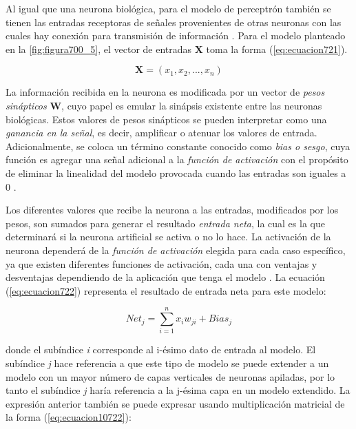 {Al igual que una neurona biológica, para el modelo de perceptrón también se tienen las entradas receptoras de señales provenientes de otras neuronas con las cuales hay conexión para transmisión de información \cite{caicedoANN}. 
Para el modelo planteado en la \autoref{fig:figura700_5}, el vector de entradas \textbf{X} toma la forma (\ref{eq:ecuacion721}).

\begin{equation}
	\textbf{X}= (x_1, x_2, ... , x_n)
	\label{eq:ecuacion721}
\end{equation}

La información recibida en la neurona es modificada por un vector de \textit{pesos sinápticos} \textbf{W}, cuyo papel es emular la sinápsis existente entre las neuronas biológicas. Estos valores de pesos sinápticos se pueden 
interpretar como una \textit{ganancia en la señal}, es decir, amplificar o atenuar los valores de entrada. Adicionalmente, se coloca un término constante conocido como \textit{bias o sesgo}, cuya función es agregar una señal 
adicional a la \textit{función de activación} con el propósito de eliminar la linealidad del modelo provocada cuando las entradas son iguales a 0 \cite{caicedoANN}.

Los diferentes valores que recibe la neurona a las entradas, modificados por los pesos, son sumados para generar el resultado \textit{entrada neta}, la cual es la que determinará si la neurona artificial se activa o no lo hace. 
La activación de la neurona dependerá de la \textit{función de activación} elegida para cada caso específico, ya que existen diferentes funciones de activación, cada una con ventajas y desventajas dependiendo de la aplicación 
que tenga el modelo \cite{caicedoANN}. La ecuación (\ref{eq:ecuacion722}) representa el resultado de entrada neta para este modelo:

\begin{equation}
	Net_j= \sum_{i=1}^{n} {x_i w_{ji} + Bias_j}
	\label{eq:ecuacion722}
\end{equation}

donde el subíndice \textit{i} corresponde al i-ésimo dato de entrada al modelo. El subíndice \textit{j} hace referencia a que este tipo de modelo se puede extender a un modelo con un mayor número de capas verticales de neuronas 
apiladas, por lo tanto el subíndice \textit{j} haría referencia a la j-ésima capa en un modelo extendido. La expresión anterior también se puede expresar usando multiplicación matricial de la forma (\ref{eq:ecuacion10722}):

}
